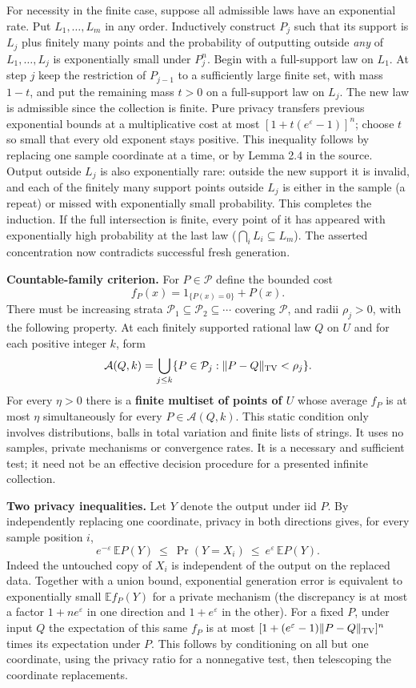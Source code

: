 \documentclass[11pt]{article}
\begin{document}
For necessity in the finite case, suppose all admissible laws have an exponential rate. Put \(L_1,\ldots,L_m\) in any order. Inductively construct \(P_j\) such that its support is \(L_j\) plus finitely many points and the probability of outputting outside \emph{any} of \(L_1,\ldots,L_j\) is exponentially small under \(P_j^n\). Begin with a full-support law on \(L_1\). At step \(j\) keep the restriction of \(P_{j-1}\) to a sufficiently large finite set, with mass \(1-t\), and put the remaining mass \(t>0\) on a full-support law on \(L_j\). The new law is admissible since the collection is finite. Pure privacy transfers previous exponential bounds at a multiplicative cost at most \([1+t(e^\varepsilon-1)]^n\); choose \(t\) so small that every old exponent stays positive. This inequality follows by replacing one sample coordinate at a time, or by Lemma 2.4 in the source. Output outside \(L_j\) is also exponentially rare: outside the new support it is invalid, and each of the finitely many support points outside \(L_j\) is either in the sample (a repeat) or missed with exponentially small probability. This completes the induction. If the full intersection is finite, every point of it has appeared with exponentially high probability at the last law (\(\bigcap_iL_i\subseteq L_m\)). The asserted concentration now contradicts successful fresh generation.

\textbf{Countable-family criterion.} For \(P\in\mathcal P\) define the bounded cost
\[f_P(x)=1_{\{P(x)=0\}}+P(x).\]
There must be increasing strata \(\mathcal P_1\subseteq\mathcal P_2\subseteq\cdots\) covering \(\mathcal P\), and radii \(\rho_j>0\), with the following property. At each finitely supported rational law \(Q\) on \(U\) and for each positive integer \(k\), form
\[\mathcal A(Q,k)=\bigcup_{j\leq k}\{P\in\mathcal P_j: \|P-Q\|_{\rm TV}<\rho_j\}.\]
For every \(\eta>0\) there is a \textbf{finite multiset of points of \(U\)} whose average \(f_P\) is at most \(\eta\) simultaneously for every \(P\in\mathcal A(Q,k)\). This static condition only involves distributions, balls in total variation and finite lists of strings. It uses no samples, private mechanisms or convergence rates. It is a necessary and sufficient test; it need not be an effective decision procedure for a presented infinite collection.

\textbf{Two privacy inequalities.} Let \(Y\) denote the output under iid \(P\). By independently replacing one coordinate, privacy in both directions gives, for every sample position \(i\),
\[ e^{-\varepsilon}\,\mathbb E P(Y)\ \le\ \Pr(Y=X_i)\ \le\ e^\varepsilon\,\mathbb E P(Y).\]
Indeed the untouched copy of \(X_i\) is independent of the output on the replaced data. Together with a union bound, exponential generation error is equivalent to exponentially small \(\mathbb E f_P(Y)\) for a private mechanism (the discrepancy is at most a factor \(1+ne^\varepsilon\) in one direction and \(1+e^\varepsilon\) in the other). For a fixed \(P\), under input \(Q\) the expectation of this same \(f_P\) is at most \([1+(e^\varepsilon-1)\|P-Q\|_{\rm TV}]^n\) times its expectation under \(P\). This follows by conditioning on all but one coordinate, using the privacy ratio for a nonnegative test, then telescoping the coordinate replacements.
\end{document}

